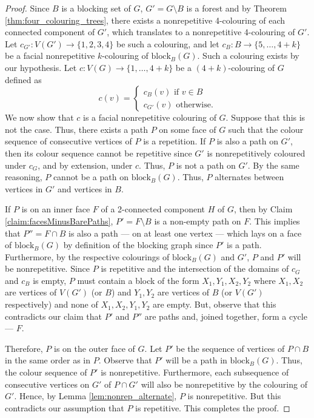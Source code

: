 \documentclass{patmorin}
\newcommand{\block}{\mathrm{block}}
\begin{document}
\begin{proof}
 Since $B$ is a blocking set of $G$, $G'=G \setminus B$ is a forest and by Theorem \ref{thm:four_colouring_trees}, there exists a nonrepetitive 4-colouring of each connected component of $G'$, which translates to a nonrepetitive 4-colouring of $G'$. Let $c_{G'} : V(G') \rightarrow \{1,2,3,4\}$ be such a colouring, and let $c_B : B \rightarrow \{5,\ldots,4+k\}$ be a facial nonrepetitive $k$-colouring of $\block_{B}(G)$. Such a colouring exists by our hypothesis. Let $c : V(G) \rightarrow \{1,\ldots,4+k\}$ be a $(4+k)$-colouring of $G$ defined as
 \begin{equation}
 c(v) = \begin{cases}
         c_B(v) \text{ if } v \in B\\
         c_{G'}(v) \text{ otherwise}.
        \end{cases}
 \end{equation}
 We now show that $c$ is a facial nonrepetitive colouring of $G$. Suppose that this is not the case. Thus, there exists a path $P$ on some face of $G$ such that the colour sequence of consecutive vertices of $P$ is a repetition. If $P$ is also a path on $G'$, then its colour sequence cannot be repetitive since $G'$ is nonrepetitively coloured under $c_G$, and by extension, under $c$. Thus, $P$ is not a path on $G'$. By the same reasoning, $P$ cannot be a path on $\block_{B}(G)$. Thus, $P$ alternates between vertices in $G'$ and vertices in $B$. 
 
 If $P$ is on an inner face $F$ of a 2-connected component $H$ of $G$, then by Claim \ref{claim:facesMinusBarePaths}, $P'=F \setminus B$ is a non-empty path on $F$. This implies that $P''=F\cap B$ is also a path --- on at least one vertex --- which lays on a face of $\block_{B}(G)$ by definition of the blocking graph since $P'$ is a path. Furthermore, by the respective colourings of $\block_B(G)$ and $G'$, $P$ and $P'$ will be nonrepetitive. Since $P$ is repetitive and the intersection of the domains of $c_G$ and $c_B$ is empty, $P$ must contain a block of the form $X_1,Y_1,X_2,Y_2$ where $X_1,X_2$ are vertices of $V(G')$ (or $B$) and $Y_1,Y_2$ are vertices of $B$ (or $V(G')$ respectively) and none of $X_1,X_2,Y_1,Y_2$ are empty. But, observe that this contradicts our claim that $P'$ and $P''$ are paths and, joined together, form a cycle --- $F$.
 
 Therefore, $P$ is on the outer face of $G$. Let $P'$ be the sequence of vertices of $P\cap B$ in the same order as in $P$. Observe that $P'$ will be a path in $\block_{B}(G)$. Thus, the colour sequence of $P'$ is nonrepetitive. Furthermore, each subsequence of consecutive vertices on $G'$ of $P\cap G'$ will also be nonrepetitive by the colouring of $G'$. Hence, by Lemma \ref{lem:nonrep_alternate}, $P$ is nonrepetitive. But this contradicts our assumption that $P$ is repetitive. This completes the proof.
\end{proof}
\end{document}
